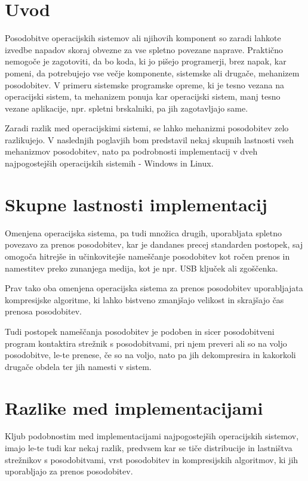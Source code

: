 \section{Uvod}

Posodobitve operacijskih sistemov ali njihovih komponent so zaradi lahkote izvedbe napadov skoraj obvezne za vse
spletno povezane naprave.
Praktično nemogoče je zagotoviti, da bo koda, ki jo pišejo programerji, brez napak, kar pomeni, da potrebujejo
vse večje komponente, sistemske ali drugače, mehanizem posodobitev.
V primeru sistemske programske opreme, ki je tesno vezana na operacijski sistem, ta mehanizem ponuja kar operacijski
sistem, manj tesno vezane aplikacije, npr. spletni brskalniki, pa jih zagotavljajo same.

Zaradi razlik med operacijskimi sistemi, se lahko mehanizmi posodobitev zelo razlikujejo.
V naslednjih poglavjih bom predstavil nekaj skupnih lastnosti vseh mehanizmov posodobitev, nato pa podrobnosti
implementacij v dveh najpogostejših operacijskih sistemih - Windows in Linux.

\section{Skupne lastnosti implementacij}

Omenjena operacijska sistema, pa tudi množica drugih, uporabljata spletno povezavo za prenos posodobitev,
kar je dandanes precej standarden postopek, saj omogoča hitrejše in učinkovitejše nameščanje posodobitev
kot ročen prenos in namestitev preko zunanjega medija, kot je npr. USB ključek ali zgoščenka.

Prav tako oba omenjena operacijska sistema za prenos posodobitev uporabljajata kompresijske algoritme,
ki lahko bistveno zmanjšajo velikost in skrajšajo čas prenosa posodobitev.

Tudi postopek nameščanja posodobitev je podoben in sicer posodobitveni program kontaktira strežnik s posodobitvami,
pri njem preveri ali so na voljo posodobitve, le-te prenese, če so na voljo, nato pa jih dekompresira in
kakorkoli drugače obdela ter jih namesti v sistem.

\section{Razlike med implementacijami}

Kljub podobnostim med implementacijami najpogostejših operacijskih sistemov, imajo le-te tudi kar nekaj razlik,
predvsem kar se tiče distribucije in lastništva strežnikov s posodobitvami, vrst posodobitev in kompresijskih
algoritmov, ki jih uporabljajo za prenos posodobitev.
